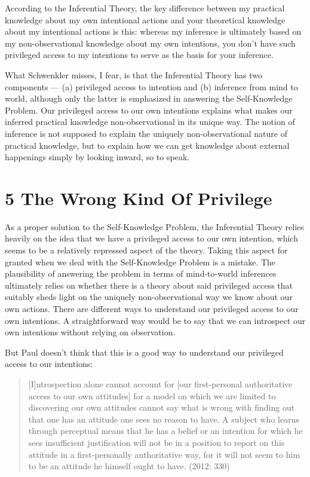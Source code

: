 \documentclass[a4paper,12pt]{article}
\begin{document}
According to the Inferential Theory, the key difference between my practical knowledge about my own intentional actions and your theoretical knowledge about my intentional actions is this: whereas my inference is ultimately based on my non-observational knowledge about my own intentions, you don't have such privileged access to my intentions to serve as the basis for your inference.

What Schwenkler misses, I fear, is that the Inferential Theory has two components --- (a) privileged access to intention and (b) inference from mind to world, although only the latter is emphasized in answering the Self-Knowledge Problem. Our privileged access to our own intentions explains what makes our inferred practical knowledge non-observational in its unique way. The notion of inference is not supposed to explain the uniquely non-observational nature of practical knowledge, but to explain how we can get knowledge about external happenings simply by looking inward, so to speak.

\section*{5 The Wrong Kind Of Privilege}
As a proper solution to the Self-Knowledge Problem, the Inferential Theory relies heavily on the idea that we have a privileged access to our own intention, which seems to be a relatively repressed aspect of the theory. Taking this aspect for granted when we deal with the Self-Knowledge Problem is a mistake. The plausibility of answering the problem in terms of mind-to-world inferences ultimately relies on whether there is a theory about said privileged access that suitably sheds light on the uniquely non-observational way we know about our own actions. There are different ways to understand our privileged access to our own intentions. A straightforward way would be to say that we can introspect our own intentions without relying on observation.

But Paul doesn't think that this is a good way to understand our privileged access to our intentions:

\begin{quote} [I]ntrospection alone cannot account for [our first-personal authoritative access to our own attitudes] for a model on which we are limited to discovering our own attitudes cannot say what is wrong with finding out that one has an attitude one sees no reason to have. A subject who learns through perceptual means that he has a belief or an intention for which he sees insufficient justification will not be in a position to report on this attitude in a first-personally authoritative way, for it will not seem to him to be an attitude he himself ought to have. (2012: 330) \end{quote}
\end{document}
